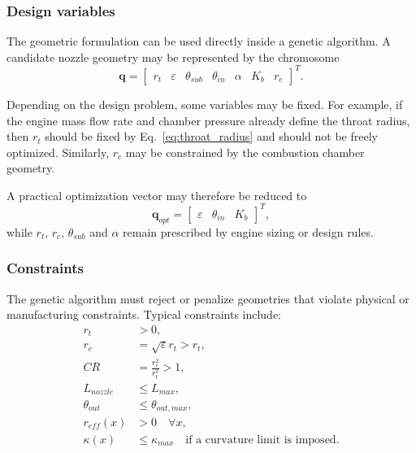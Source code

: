 \documentclass[journal,article,submit,oneauthor]{Definitions/mdpi}
\begin{document}
\subsubsection{Design variables}

The geometric formulation can be used directly inside a genetic algorithm. A candidate nozzle geometry may be represented by the chromosome
\begin{equation}
\bm{q}=\begin{bmatrix}
r_t & \varepsilon & \theta_{sub} & \theta_{in} & \alpha & K_b & r_c
\end{bmatrix}^T.
\label{eq:chromosome}
\end{equation}

Depending on the design problem, some variables may be fixed. For example, if the engine mass flow rate and chamber pressure already define the throat radius, then $r_t$ should be fixed by Eq.~\eqref{eq:throat_radius} and should not be freely optimized. Similarly, $r_c$ may be constrained by the combustion chamber geometry.

A practical optimization vector may therefore be reduced to
\begin{equation}
\bm{q}_{opt}=\begin{bmatrix}
\varepsilon & \theta_{in} & K_b
\end{bmatrix}^T,
\label{eq:chromosome_reduced}
\end{equation}
while $r_t$, $r_c$, $\theta_{sub}$ and $\alpha$ remain prescribed by engine sizing or design rules.

\subsubsection{Constraints}

The genetic algorithm must reject or penalize geometries that violate physical or manufacturing constraints. Typical constraints include:
\begin{align}
r_t &>0,\\
r_e &=\sqrt{\varepsilon}r_t>r_t,\\
CR &=\frac{r_c^2}{r_t^2}>1,\\
L_{nozzle} &\leq L_{max},\\
\theta_{out} &\leq \theta_{out,max},\\
r_{eff}(x)&>0 \quad \forall x,\\
\kappa(x)&\leq \kappa_{max} \quad \text{if a curvature limit is imposed.}
\end{align}
\end{document}
